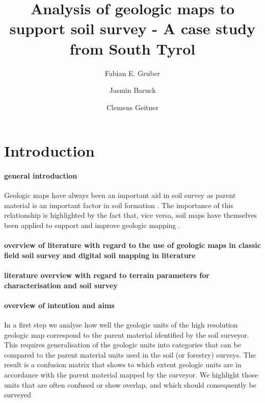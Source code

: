 \documentclass[preprint,12pt,authoryear]{elsarticle}
\begin{document}
\begin{frontmatter}

\title{Analysis of geologic maps to support soil survey - A case study from South Tyrol}


\author{Fabian E. Gruber}
\author{Jasmin Baruck}
\author{Clemens Geitner}

\address{University of Innsbruck}

\begin{abstract}

\end{abstract}

\begin{keyword}

\end{keyword}

\end{frontmatter}

\linenumbers

\section{Introduction}
\paragraph{general introduction}
Geologic maps have always been an important aid in soil survey as parent material is an important factor in soil formation \citep{Jenny1941}. The importance of this relationship is highlighted by the fact that, vice versa, soil maps have themselves been applied to support and improve geologic mapping \citep{Brevik2015}. 

\paragraph{overview of literature with regard to the use of geologic maps in classic field soil survey and digital soil mapping in literature}
\paragraph{literature overview with regard to terrain parameters for characterisation and soil survey}
\paragraph{overview of intention and aims}
In a first step we analyse how well the geologic units of the high resolution geologic map correspond to the parent material identified by the soil surveyor. This requires generalisation of the geologic units into categories that can be compared to the parent material units used in the soil (or forestry) surveys. The result is a confusion matrix that shows to which extent geologic units are in accordance with the parent material mapped by the surveyor.  We highlight those units that are often confused or show overlap, and which should consequently be surveyed  
\end{document}
